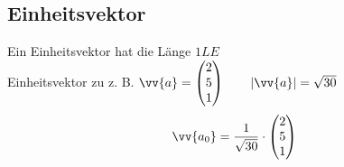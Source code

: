 \subsection{Einheitsvektor}
Ein Einheitsvektor hat die Länge $1LE$ \\
Einheitsvektor zu z. B. $\vv{a} = \begin{pmatrix}2 \\ 5 \\ 1\end{pmatrix} \qquad |\vv{a}| = \sqrt{30}$
\begin{gather*}
  \vv{a_0} = \frac{1}{\sqrt{30}} \cdot \begin{pmatrix}2 \\ 5 \\ 1\end{pmatrix}
\end{gather*}
